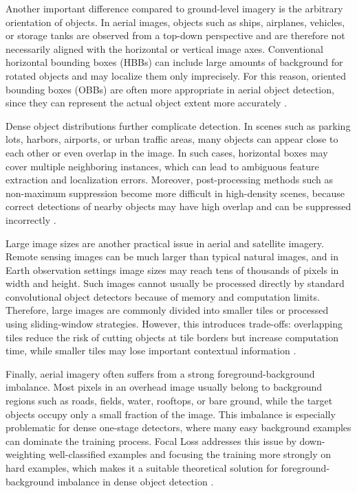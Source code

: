 Another important difference compared to ground-level imagery is the arbitrary orientation of objects. In aerial images, objects such as ships, airplanes, vehicles, or storage tanks are observed from a top-down perspective and are therefore not necessarily aligned with the horizontal or vertical image axes. Conventional horizontal bounding boxes (HBBs) can include large amounts of background for rotated objects and may localize them only imprecisely. For this reason, oriented bounding boxes (OBBs) are often more appropriate in aerial object detection, since they can represent the actual object extent more accurately \cite{ding2021object,ding2018learning}.

Dense object distributions further complicate detection. In scenes such as parking lots, harbors, airports, or urban traffic areas, many objects can appear close to each other or even overlap in the image. In such cases, horizontal boxes may cover multiple neighboring instances, which can lead to ambiguous feature extraction and localization errors. Moreover, post-processing methods such as non-maximum suppression become more difficult in high-density scenes, because correct detections of nearby objects may have high overlap and can be suppressed incorrectly \cite{ding2021object,ding2018learning}.

Large image sizes are another practical issue in aerial and satellite imagery. Remote sensing images can be much larger than typical natural images, and in Earth observation settings image sizes may reach tens of thousands of pixels in width and height. Such images cannot usually be processed directly by standard convolutional object detectors because of memory and computation limits. Therefore, large images are commonly divided into smaller tiles or processed using sliding-window strategies. However, this introduces trade-offs: overlapping tiles reduce the risk of cutting objects at tile borders but increase computation time, while smaller tiles may lose important contextual information \cite{ding2021object}.

Finally, aerial imagery often suffers from a strong foreground-background imbalance. Most pixels in an overhead image usually belong to background regions such as roads, fields, water, rooftops, or bare ground, while the target objects occupy only a small fraction of the image. This imbalance is especially problematic for dense one-stage detectors, where many easy background examples can dominate the training process. Focal Loss addresses this issue by down-weighting well-classified examples and focusing the training more strongly on hard examples, which makes it a suitable theoretical solution for foreground-background imbalance in dense object detection \cite{lin2017focal}.


